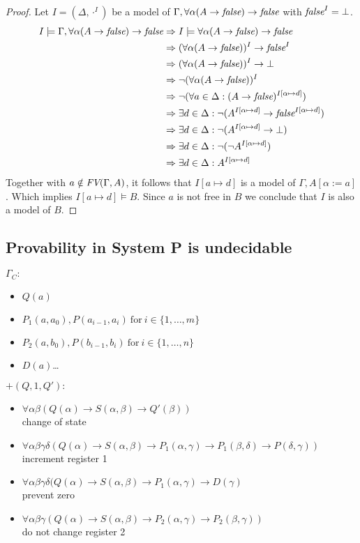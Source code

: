\begin{proof}
Let $I=(\Delta,\cdot^I)$ be a model of $\Gamma,\forall\alpha(A\to\emph{false})\to\emph{false}$ with $\emph{false}^I=\bot$.
\begin{align*}
I\models\Gamma,\forall\alpha(A\to\emph{false})\to\emph{false}&\Rightarrow I\models\forall\alpha(A\to\emph{false})\to\emph{false}\\
&\Rightarrow (\forall\alpha(A\to\emph{false}))^I\to\emph{false}^I\\
&\Rightarrow (\forall\alpha(A\to\emph{false}))^I\to\bot\\
&\Rightarrow \neg(\forall\alpha(A\to\emph{false}))^I\\
&\Rightarrow \neg(\forall a\in\Delta:(A\to\emph{false})^{I\left[\alpha\mapsto d\right]})\\
&\Rightarrow \exists d\in\Delta:\neg(A^{I\left[\alpha\mapsto d\right]}\to\emph{false}^{I\left[\alpha\mapsto d\right]})\\
&\Rightarrow \exists d\in\Delta:\neg(A^{I\left[\alpha\mapsto d\right]}\to\bot)\\
&\Rightarrow \exists d\in\Delta:\neg(\neg A^{I\left[\alpha\mapsto d\right]})\\
&\Rightarrow \exists d\in\Delta:A^{I\left[\alpha\mapsto d\right]}\\
\end{align*}
Together with $a\notin\emph{FV}(\Gamma,A)$, it follows that $I\left[a\mapsto d\right]$ is a model of $\Gamma,A\left[\alpha:=a\right]$. Which implies $I\left[a\mapsto d\right]\models B$.	Since $a$ is not free in $B$ we conclude that $I$ is also a model of $B$.
\end{proof}
\subsection{Provability in System P is undecidable}
$\Gamma_C:$
\begin{itemize}
\item $Q(a)$
\item $P_1(a,a_0),P(a_{i-1},a_i)~\text{for}~i\in\{1,\dots,m\}$
\item $P_2(a,b_0),P(b_{i-1},b_i)~\text{for}~i\in\{1,\dots,n\}$
\item $D(a)$\dots
\end{itemize}

$+(Q,1,Q'):$
\begin{itemize}
\item $\forall\alpha\beta(Q(\alpha)\to S(\alpha,\beta)\to Q'(\beta))$ \\change of state
\item $\forall\alpha\beta\gamma\delta(Q(\alpha)\to S(\alpha,\beta)\to P_1(\alpha,\gamma)\to P_1(\beta,\delta)\to P(\delta,\gamma))$\\increment register 1
\item $\forall\alpha\beta\gamma\delta(Q(\alpha)\to S(\alpha,\beta)\to P_1(\alpha,\gamma)\to D(\gamma)$ \\prevent zero %
\item $\forall\alpha\beta\gamma(Q(\alpha)\to S(\alpha,\beta)\to P_2(\alpha,\gamma)\to P_2(\beta,\gamma))$ \\do not change register 2
\end{itemize}

